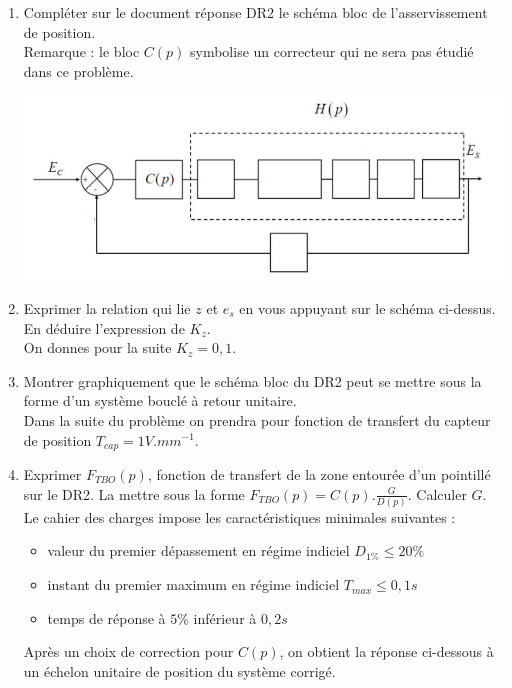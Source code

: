 \begin{enumerate}
\item Compl\'eter sur le document r\'eponse DR2 le sch\'ema bloc de l'asservissement de position.\\
Remarque : le bloc $C(p)$ symbolise un correcteur qui ne sera pas \'etudi\'e dans ce probl\`eme.\\

\begin{center}
\includegraphics[scale=0.3]{png/image5_prob3.png}
\end{center}

\item Exprimer la relation qui lie $z$ et $e_s$ en vous appuyant sur le sch\'ema ci-dessus. En d\'eduire l'expression de $K_z$.\\
On donnes pour la suite $K_z = 0,1$.
\item Montrer graphiquement que le sch\'ema bloc du DR2 peut se mettre sous la forme d'un syst\`eme boucl\'e \`a retour unitaire.\\
Dans la suite du probl\`eme on prendra pour fonction de transfert du capteur de position $T_{cap}=1 V.mm^{-1}$.
\item Exprimer $F_{TBO}(p)$, fonction de transfert de la zone entour\'ee d'un pointill\'e sur le DR2. La mettre sous la forme $F_{TBO}(p)=C(p).\frac{G}{D(p)}$. Calculer $G$.\\
Le cahier des charges impose les caract\'eristiques minimales suivantes :
\begin{itemize}
\item valeur du premier d\'epassement en r\'egime indiciel $D_{1\%}\leq 20\%$
\item instant du premier maximum en r\'egime indiciel $T_{max} \leq 0,1s$
\item temps de r\'eponse \`a $5\%$ inf\'erieur \`a $0,2s$
\end{itemize}
Apr\`es un choix de correction pour $C(p)$, on obtient la r\'eponse ci-dessous \`a un \'echelon unitaire de position du syst\`eme corrig\'e.


\end{enumerate}
